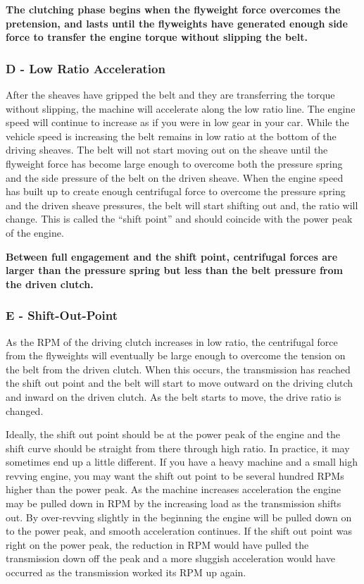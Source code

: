 \documentclass[12pt, titlepage]{article}
\begin{document}
\textbf{The clutching phase begins when the flyweight force overcomes the pretension, and lasts until the flyweights have generated enough side force to transfer the engine torque without slipping the belt.}

\subsubsection*{D - Low Ratio Acceleration}

After the sheaves have gripped the belt and they are transferring the torque without slipping, the machine will accelerate along the low ratio line. The engine speed will continue to increase as if you were in low gear in your car. While the vehicle speed is increasing the belt remains in low ratio at the bottom of the driving sheaves. The belt will not start moving out on the sheave until the flyweight force has become large enough to overcome both the pressure spring and the side pressure of the belt on the driven sheave. When the engine speed has built up to create enough centrifugal force to overcome the pressure spring and the driven sheave pressures, the belt will start shifting out and, the ratio will change. This is called the “shift point” and should coincide with the power peak of the engine.

\textbf{Between full engagement and the shift point, centrifugal forces are larger than the pressure spring but less than the belt pressure from the driven clutch.}

\subsubsection*{E - Shift-Out-Point}
As the RPM of the driving clutch increases in low ratio, the centrifugal force from the flyweights will eventually be large enough to overcome the tension on the belt from the driven clutch. When this occurs, the transmission has reached the shift out point and the belt will start to move outward on the driving clutch and inward on the driven clutch. As the belt starts to move, the drive ratio is changed.

Ideally, the shift out point should be at the power peak of the engine and the shift curve should be straight from there through high ratio. In practice, it may sometimes end up a little different. If you have a heavy machine and a small high revving engine, you may want the shift out point to be several hundred RPMs higher than the power peak. As the machine increases acceleration the engine may be pulled down in RPM by the increasing load as the transmission shifts out. By over-revving slightly in the beginning the engine will be pulled down on to the power peak, and smooth acceleration continues. If the shift out point was right on the power peak, the reduction in RPM would have pulled the transmission down off the peak and a more sluggish acceleration would have occurred as the transmission worked its RPM up again.
\end{document}
